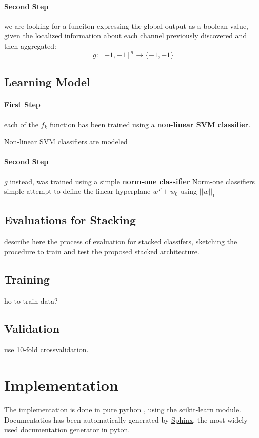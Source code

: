 \documentclass[10pt]{article}
\begin{document}
\paragraph{Second Step} we are looking for a funciton expressing the global output as a boolean value, given the localized information about each channel previously discovered and then aggregated:
$$
g: [-1, +1]^n \to \{-1, +1\}
$$


\subsection{Learning Model}

\paragraph{First Step} each of the ${f_k}$ function has been trained using a \textbf{non-linear SVM classifier}.

Non-linear SVM classifiers are modeled 

\paragraph{Second Step} $g$ instead, was trained using a simple \textbf{norm-one classifier}
Norm-one classifiers simple attempt to define the linear hyperplane 
$w^T + w_0$ using $||w||_1$


\subsection{Evaluations for Stacking}
describe here the process of evaluation for stacked classifers, sketching the procedure to train and test the proposed stacked architecture.


\subsection{Training}
ho to train data?


\subsection{Validation}
use 10-fold crossvalidation.



\section{Implementation}
The implementation is done in pure 
\href{https://python.org/}{python}
, using the
\href{http://scikit-learn.org/stable/}{scikit-learn}
module. Documentatios has been automatically generated by
\href{http://sphinx-doc.org/}{Sphinx}, the most widely used documentation generator in pyton.
\end{document}
